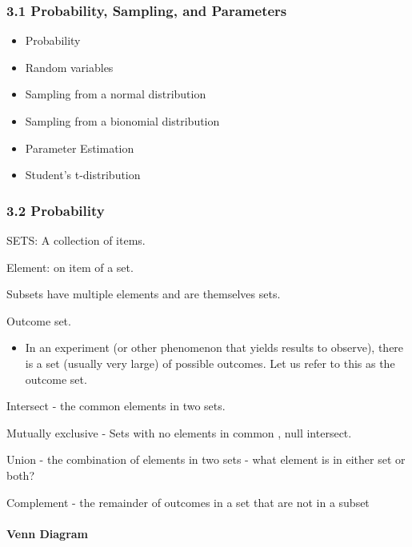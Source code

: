 \documentclass[]{article}
\providecommand{\tightlist}{%
  \setlength{\itemsep}{0pt}\setlength{\parskip}{0pt}}
\let\oldparagraph\paragraph
\renewcommand{\paragraph}[1]{\oldparagraph{#1}\mbox{}}
\begin{document}
\hypertarget{probability-sampling-and-parameters-1}{%
\subsubsection{3.1 Probability, Sampling, and
Parameters}\label{probability-sampling-and-parameters-1}}

\begin{itemize}
\tightlist
\item
  Probability
\item
  Random variables
\item
  Sampling from a normal distribution
\item
  Sampling from a bionomial distribution
\item
  Parameter Estimation
\item
  Student's t-distribution
\end{itemize}

\hypertarget{probability}{%
\subsubsection{3.2 Probability}\label{probability}}

SETS: A collection of items.

Element: on item of a set.

Subsets have multiple elements and are themselves sets.

Outcome set.

\begin{itemize}
\tightlist
\item
  In an experiment (or other phenomenon that yields results to observe),
  there is a set (usually very large) of possible outcomes. Let us refer
  to this as the outcome set.
\end{itemize}

Intersect - the common elements in two sets.

Mutually exclusive - Sets with no elements in common , null intersect.

Union - the combination of elements in two sets - what element is in
either set or both?

Complement - the remainder of outcomes in a set that are not in a subset

\hypertarget{venn-diagram}{%
\paragraph{Venn Diagram}\label{venn-diagram}}
\end{document}
